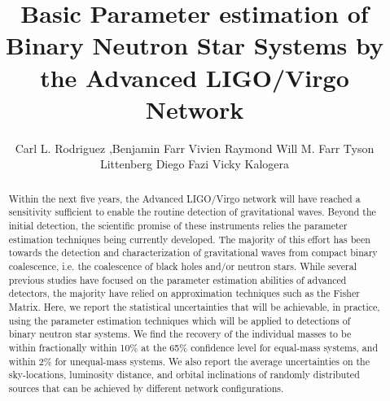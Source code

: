 \documentclass[11pt,a4paper]{emulateapj}
\begin{document}
\title{Basic Parameter estimation of Binary Neutron Star Systems by the Advanced LIGO/Virgo Network}
\author{Carl L. Rodriguez 
,Benjamin Farr 
Vivien Raymond 
Will M. Farr 
Tyson Littenberg
Diego Fazi
Vicky Kalogera}




\begin{abstract}

Within the next five years, the Advanced LIGO/Virgo network will have reached a sensitivity sufficient to enable the routine
 detection of gravitational waves.  Beyond the initial detection, the scientific promise of these instruments relies the 
 parameter estimation techniques being currently developed.  The majority of this effort has been towards the detection
   and characterization of gravitational waves from compact binary coalescence, i.e. the coalescence of black holes and/or 
   neutron stars.  While several previous studies have focused on the parameter estimation abilities of advanced detectors, 
   the majority have relied on approximation techniques such as the Fisher Matrix.  Here, we report the statistical 
   uncertainties that will be achievable, in practice, using the parameter estimation techniques which will be applied to 
   detections of binary neutron star systems.  We find the recovery of the individual masses to be within fractionally within 
   10\% at the 65\% confidence level for equal-mass systems, and within 2\% for unequal-mass systems.
     We also report the average uncertainties on the sky-locations, luminosity distance, and orbital inclinations of randomly 
     distributed sources that can be achieved by different network configurations.
\end{abstract}

\maketitle
\end{document}
